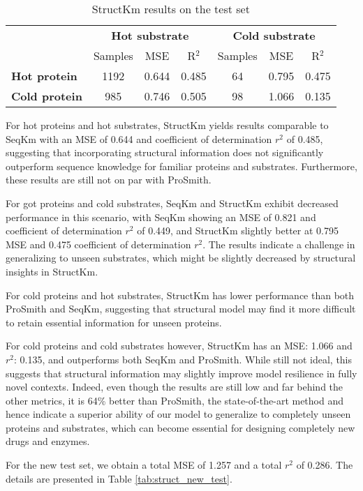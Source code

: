  \begin{table}[ht]
  \centering
  \begin{tabular}{lcccccc}
  \hline
   & \multicolumn{3}{c}{\textbf{Hot substrate}} & \multicolumn{3}{c}{\textbf{Cold substrate}} \\
   & Samples & MSE & R\(^2\) & Samples & MSE & R\(^2\) \\ \hline
  \textbf{Hot protein}  & 1192 & 0.644 & 0.485 & 64 & 0.795 & 0.475 \\
  \textbf{Cold protein} & 985 & 0.746 & 0.505 & 98 & 1.066 & 0.135 \\ \hline
  \end{tabular}
  \caption{StructKm results on the test set}
  \label{tab:structkm_results}
\end{table}

For hot proteins and hot substrates, StructKm yields results comparable to SeqKm with an MSE of 0.644 and coefficient of determination $r^2$ of 0.485, suggesting that incorporating structural information does not significantly outperform sequence knowledge for familiar proteins and substrates. Furthermore, these results are still not on par with ProSmith.

For got proteins and cold substrates, SeqKm and StructKm exhibit decreased performance in this scenario, with SeqKm showing an MSE of 0.821 and coefficient of determination $r^2$ of 0.449, and StructKm slightly better at 0.795 MSE and 0.475 coefficient of determination $r^2$. The results indicate a challenge in generalizing to unseen substrates, which might be slightly decreased by structural insights in StructKm.

For cold proteins and hot substrates, StructKm has lower performance than both ProSmith and SeqKm, suggesting that structural model may find it more difficult to retain essential information for unseen proteins. 

For cold proteins and cold substrates however, StructKm has an MSE: 1.066 and $r^2$: 0.135, and outperforms both SeqKm and ProSmith. While still not ideal, this suggests that structural information may slightly improve model resilience in fully novel contexts. Indeed, even though the results are still low and far behind the other metrics, it is 64\% better than ProSmith, the state-of-the-art method and hence indicate a superior ability of our model to generalize to completely unseen proteins and substrates, which can become essential for designing completely new drugs and enzymes. 

For the new test set, we obtain a total MSE of 1.257 and a total $r^2$ of 0.286. The details are presented in Table \ref{tab:struct_new_test}.

